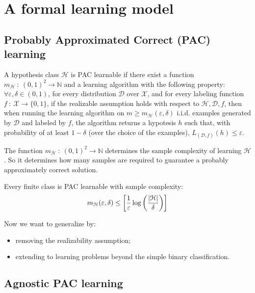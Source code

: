 \documentclass[../../main/main.tex]{subfiles}
\begin{document}
\chapter{A formal learning model}

\section{Probably Approximated Correct (PAC) learning}
\begin{definition}
    A hypothesis class \( \mathcal{H} \) is PAC learnable if there exist a function \( m_{\mathcal{H}} \ : \ (0,1)^2 \to \mathbb{N} \) and a learning algorithm with the following property:
    \( \forall \varepsilon, \delta \in (0,1) \), for every distribution \( \mathcal{D} \) over \( \mathcal{X} \),
    and for every labeling function \( f \ : \ \mathcal{X} \to \{ 0,1 \} \), if the realizable assumption holds with respect to \( \mathcal{H}, \mathcal{D}, f \),
    then when running the learning algorithm on \( m \ge m_{\mathcal{H}}(\varepsilon, \delta) \) i.i.d. examples generated by \( \mathcal{D} \) and labeled by \( f \),
    the algorithm returns a hypotesis \( h \) such that, with probability of at least \( 1 - \delta \) (over the choice of the examples), \( L_{(\mathcal{D},f)}(h) \le \varepsilon \).
\end{definition}

The function \( m_{\mathcal{H}} \ : \ (0,1)^2 \to \mathbb{N} \) determines the sample complexity of learning \( \mathcal{H} \).
So it determines how many samples are required to guarantee a probably approximately correct solution.

\begin{corollary}[]
    Every finite class is PAC learnable with sample complexity:
    \begin{equation}
        m_{\mathcal{H}}(\varepsilon, \delta)
        \le
        \left[
        \frac{1}{\varepsilon} \log{\left( \frac{\abs{\mathcal{H}}}{\delta} \right)}
        \right]
        \label{eq:C2_PAC}
    \end{equation}
\end{corollary}

Now we want to generalize by:
\begin{itemize}
    \item removing the realizability assumption;
    \item extending to learning problems beyond the simple binary classification.
\end{itemize}





\section{Agnostic PAC learning}
\end{document}
